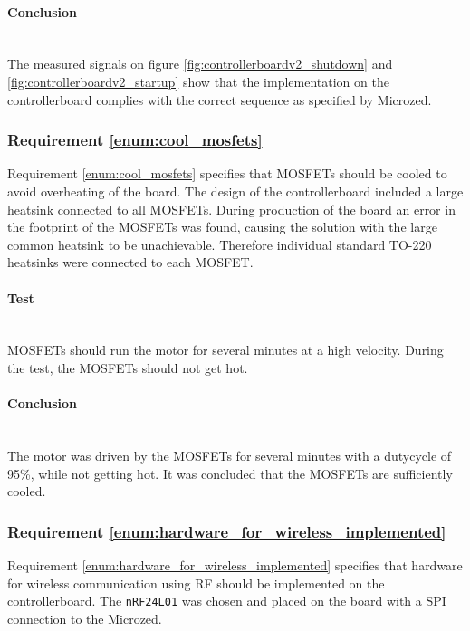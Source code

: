 \paragraph{Conclusion}~\\
The measured signals on figure \ref{fig:controllerboardv2_shutdown} and \ref{fig:controllerboardv2_startup} show that the implementation on the controllerboard complies with the correct sequence as specified by Microzed.


\subsubsection{Requirement \ref{enum:cool_mosfets}} %
\label{ssub:requirement_ref_enum:cool_mosfets}
Requirement \ref{enum:cool_mosfets} specifies that MOSFETs should be cooled to avoid overheating of the board. 
The design of the controllerboard included a large heatsink connected to all MOSFETs. 
During production of the board an error in the footprint of the MOSFETs was found, causing the solution with the large common heatsink to be unachievable.
Therefore individual standard TO-220 heatsinks were connected to each MOSFET.

\paragraph{Test}~\\
MOSFETs should run the motor for several minutes at a high velocity. 
During the test, the MOSFETs should not get hot.

\paragraph{Conclusion}~\\
The motor was driven by the MOSFETs for several minutes with a dutycycle of 95\%, while not getting hot.
It was concluded that the MOSFETs are sufficiently cooled.

\subsubsection{Requirement \ref{enum:hardware_for_wireless_implemented}} %
\label{ssub:requirement_enum:hardware_for_wireless_implemented}
Requirement \ref{enum:hardware_for_wireless_implemented} specifies that hardware for wireless communication using RF should be implemented on the controllerboard.
The \texttt{nRF24L01} was chosen and placed on the board with a SPI connection to the Microzed.

